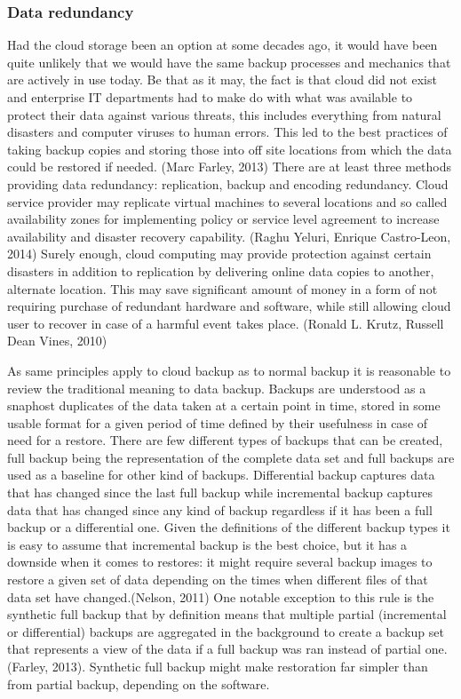 \documentclass{article}
\begin{document}
\subsubsection{Data redundancy}
Had the cloud storage been an option at some decades ago, it would have been quite unlikely that we would have the same backup processes and mechanics that are actively in use today. Be that as it may, the fact is that cloud did not exist and enterprise IT departments had to make do with what was available to protect their data against various threats, this includes everything from natural disasters and computer viruses to human errors. This led to the best practices of taking backup copies and storing those into off site locations from which the data could be restored if needed. (Marc Farley, 2013) 
There are at least three methods providing data redundancy: replication, backup and encoding redundancy. Cloud service provider may replicate virtual machines to several locations and so called availability zones for implementing policy or service level agreement to increase availability and disaster recovery capability. (Raghu Yeluri, Enrique Castro-Leon, 2014) Surely enough, cloud computing may provide protection against certain disasters in addition to replication by delivering online data copies to another, alternate location. This may save significant amount of money in a form of not requiring purchase of redundant hardware and software, while still allowing cloud user to recover in case of a harmful event takes place. (Ronald L. Krutz, Russell Dean Vines, 2010)
\par
As same principles apply to cloud backup as to normal backup it is reasonable to review the traditional meaning to data backup. Backups are understood as a snaphost duplicates of the data taken at a certain point in time, stored in some usable format for a given period of time defined by their usefulness in case of need for a restore. There are few different types of backups that can be created, full backup being the representation of the complete data set and full backups are used as a baseline for other kind of backups. Differential backup captures data that has changed since the last full backup while incremental backup captures data that has changed since any kind of backup regardless if it has been a full backup or a differential one. Given the definitions of the different backup types it is easy to assume that incremental backup is the best choice, but it has a downside when it comes to restores: it might require several backup images to restore a given set of data depending on the times when different files of that data set have changed.(Nelson, 2011) One notable exception to this rule is the synthetic full backup that by definition means that multiple partial (incremental or differential) backups are aggregated in the background to create a backup set that represents a view of the data if a full backup was ran instead of partial one.(Farley, 2013). Synthetic full backup might make restoration far simpler than from partial backup, depending on the software.
\end{document}
